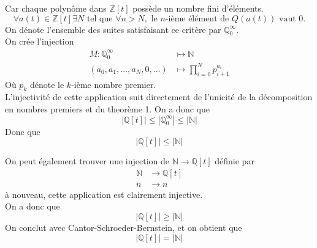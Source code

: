 \documentclass[11pt, a4paper, twoside]{article}
\begin{document}
Car chaque polynôme dans $\mathbb{Z}[t]$ possède un nombre fini d'éléments.
\[ 
	\forall a(t) \in \mathbb{Z}[t] \exists N \text{ tel que } \forall n > N, \text{ le $n$-ième élément de } Q(a(t)) \text{ vaut  } 0.
\]
On dénote l'ensemble des suites satisfaisant ce critère par $\mathbb{Q}_0^{ \infty}$.\\
On crée l'injection
\begin{align*}
M:
\mathbb{Q}_0^{ \infty} &\mapsto \mathbb{N}\\
(a_0,a_1, \ldots, a_N, 0, \ldots) &\mapsto \prod_{i=0} ^{ N} p_{i+1} ^{a_i}
\end{align*}
Où $p_k$ dénote le $k$-ième nombre premier.\\
L'injectivité de cette application suit directement de l'unicité de la décomposition en nombres premiers et du theorème 1.
On a donc que
\[ 
	|\mathbb{Q}[t]| \leq |\mathbb{Q}_{0} ^{ \infty}| \leq |\mathbb{N}|
\]
Donc que
\[ 
	|\mathbb{Q}[t]| \leq |\mathbb{N}|
\]

On peut également trouver une injection de $\mathbb{N} \to \mathbb{Q}[t]$ définie par
\begin{align*}
	\mathbb{N} &\to \mathbb{Q}[t]\\
	n &\to n 
\end{align*}
à nouveau, cette application est clairement injective.\\
On a donc que
\[ 
	|\mathbb{Q}[t]| \geq |\mathbb{N}|
\]
On conclut avec Cantor-Schroeder-Bernstein, et on obtient que 
\[ 
	|\mathbb{Q}[t]| = |\mathbb{N}|
\]




\end{document}
